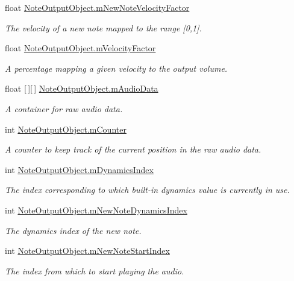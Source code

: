 \begin{DoxyCompactItemize}
float \hyperlink{group___n_o_o_priv_var_gaf3cd650d21c56c25ce988d9f75279278}{Note\+Output\+Object.\+m\+New\+Note\+Velocity\+Factor}
\begin{DoxyCompactList}\small\item\em The velocity of a new note mapped to the range \mbox{[}0,1\mbox{]}. \end{DoxyCompactList}\item 
float \hyperlink{group___n_o_o_priv_var_ga84df25e871d69746a7c520f3f8b49a27}{Note\+Output\+Object.\+m\+Velocity\+Factor}
\begin{DoxyCompactList}\small\item\em A percentage mapping a given velocity to the output volume. \end{DoxyCompactList}\item 
float \mbox{[}$\,$\mbox{]}\mbox{[}$\,$\mbox{]} \hyperlink{group___n_o_o_priv_var_ga842eef5bfade070f914b8a551b3bcf43}{Note\+Output\+Object.\+m\+Audio\+Data}
\begin{DoxyCompactList}\small\item\em A container for raw audio data. \end{DoxyCompactList}\item 
int \hyperlink{group___n_o_o_priv_var_ga5dca97be8d58837ace4ea6f4a972b20a}{Note\+Output\+Object.\+m\+Counter}
\begin{DoxyCompactList}\small\item\em A counter to keep track of the current position in the raw audio data. \end{DoxyCompactList}\item 
int \hyperlink{group___n_o_o_priv_var_gaf0c9c2a90b5d73b8ffa0906bc69acdbc}{Note\+Output\+Object.\+m\+Dynamics\+Index}
\begin{DoxyCompactList}\small\item\em The index corresponding to which built-\/in dynamics value is currently in use. \end{DoxyCompactList}\item 
int \hyperlink{group___n_o_o_priv_var_ga13de232048b35fc513f8aa3eeef65de0}{Note\+Output\+Object.\+m\+New\+Note\+Dynamics\+Index}
\begin{DoxyCompactList}\small\item\em The dynamics index of the new note. \end{DoxyCompactList}\item 
int \hyperlink{group___n_o_o_priv_var_ga93720712088a4b6f91abe63d6f07a2c2}{Note\+Output\+Object.\+m\+New\+Note\+Start\+Index}
\begin{DoxyCompactList}\small\item\em The index from which to start playing the audio. \end{DoxyCompactList}\item 

\end{DoxyCompactItemize}
